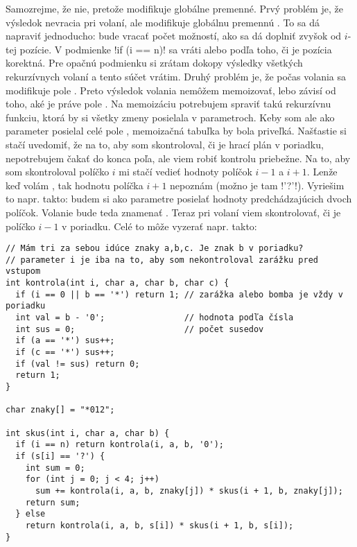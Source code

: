 Samozrejme, že nie, pretože modifikuje globálne premenné. Prvý problém je, že výsledok nevracia
pri volaní, ale modifikuje globálnu premennú . To sa dá napraviť jednoducho:
 bude vracať počet možností, ako sa dá doplniť zvyšok od $i$-tej pozície. V podmienke
\prg!if (i == n)! sa vráti  alebo  podľa toho, či je pozícia korektná.
Pre opačnú podmienku si zrátam dokopy výsledky všetkých rekurzívnych volaní a tento súčet vrátim.
Druhý problém je, že počas volania sa modifikuje pole . Preto výsledok volania 
nemôžem memoizovať, lebo závisí od toho, aké je práve pole . Na memoizáciu potrebujem spraviť takú 
rekurzívnu funkciu, ktorá by si všetky zmeny posielala v parametroch. Keby som ale ako parameter
posielal celé pole , memoizačná tabuľka by bola priveľká. Našťastie si stačí uvedomiť, že na to, aby som 
skontroloval, či je hrací plán v poriadku, nepotrebujem čakať do konca poľa, ale viem robiť kontrolu
priebežne. Na to, aby som skontroloval políčko $i$ mi stačí vedieť hodnoty políčok $i-1$ a $i+1$.
Lenže keď volám , tak hodnotu políčka $i+1$ nepoznám (možno je tam \prg!'?'!). 
Vyriešim to napr. takto: budem si ako parametre posielať hodnoty predchádzajúcich dvoch políčok.
Volanie  bude teda znamenať .
Teraz pri volaní  viem skontrolovať, či je políčko $i-1$ v poriadku.
Celé to môže vyzerať napr. takto:

\begin{lstlisting}
// Mám tri za sebou idúce znaky a,b,c. Je znak b v poriadku?
// parameter i je iba na to, aby som nekontroloval zarážku pred vstupom
int kontrola(int i, char a, char b, char c) {
  if (i == 0 || b == '*') return 1; // zarážka alebo bomba je vždy v poriadku
  int val = b - '0';                // hodnota podľa čísla  
  int sus = 0;                      // počet susedov
  if (a == '*') sus++;
  if (c == '*') sus++;
  if (val != sus) return 0;
  return 1;
}

char znaky[] = "*012";

int skus(int i, char a, char b) {
  if (i == n) return kontrola(i, a, b, '0');
  if (s[i] == '?') {
    int sum = 0;
    for (int j = 0; j < 4; j++)
      sum += kontrola(i, a, b, znaky[j]) * skus(i + 1, b, znaky[j]);
    return sum;
  } else 
    return kontrola(i, a, b, s[i]) * skus(i + 1, b, s[i]);
}
\end{lstlisting}


